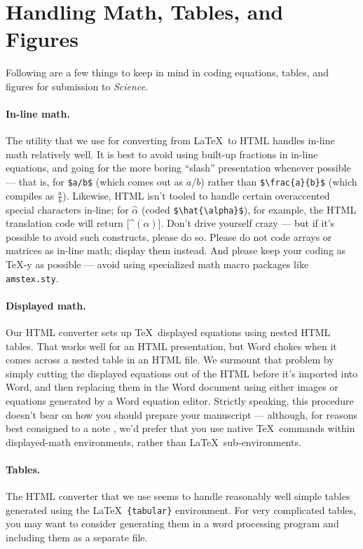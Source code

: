 \documentclass[12pt]{article}
\theoremstyle{plain}
\theoremstyle{definition}
\theoremstyle{remark}
\begin{document}
\section*{Handling Math, Tables, and Figures}

Following are a few things to keep in mind in coding equations,
tables, and figures for submission to {\it Science}.

\paragraph*{In-line math.}  The utility that we use for converting
from \LaTeX\ to HTML handles in-line math relatively well.  It is best
to avoid using built-up fractions in in-line equations, and going for
the more boring ``slash'' presentation whenever possible --- that is,
for \verb+$a/b$+ (which comes out as $a/b$) rather than
\verb+$\frac{a}{b}$+ (which compiles as $\frac{a}{b}$).  Likewise,
HTML isn't tooled to handle certain overaccented special characters
in-line; for $\hat{\alpha}$ (coded \verb+$\hat{\alpha}$+), for
example, the HTML translation code will return [\^{}$(\alpha)$].
Don't drive yourself crazy --- but if it's possible to avoid such
constructs, please do so.  Please do not code arrays or matrices as
in-line math; display them instead.  And please keep your coding as
\TeX-y as possible --- avoid using specialized math macro packages
like \texttt{amstex.sty}.

\paragraph*{Displayed math.} Our HTML converter sets up \TeX\
displayed equations using nested HTML tables.  That works well for an
HTML presentation, but Word chokes when it comes across a nested
table in an HTML file.  We surmount that problem by simply cutting the
displayed equations out of the HTML before it's imported into Word,
and then replacing them in the Word document using either images or
equations generated by a Word equation editor.  Strictly speaking,
this procedure doesn't bear on how you should prepare your manuscript
--- although, for reasons best consigned to a note \cite{nattex}, we'd
prefer that you use native \TeX\ commands within displayed-math
environments, rather than \LaTeX\ sub-environments.

\paragraph*{Tables.}  The HTML converter that we use seems to handle
reasonably well simple tables generated using the \LaTeX\
\texttt{\{tabular\}} environment.  For very complicated tables, you
may want to consider generating them in a word processing program and
including them as a separate file.
\end{document}
